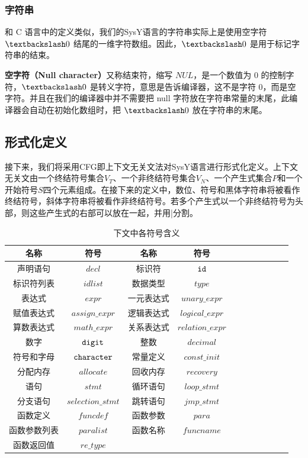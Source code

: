 \documentclass[UTF8,a4paper,10pt]{ctexart}
\begin{document}
\subsubsection{字符串}
和 C 语言中的定义类似，我们的SysY语言的字符串实际上是使用空字符 $\textbackslash0$ 结尾的一维字符数组。因此，$\textbackslash0$ 是用于标记字符串的结束。

\textbf{空字符（Null character）}又称结束符，缩写 $NUL$，是一个数值为 0 的控制字符，$\textbackslash0$ 是转义字符，意思是告诉编译器，这不是字符 0，而是空字符。并且在我们的编译器中并不需要把 null 字符放在字符串常量的末尾，此编译器会自动在初始化数组时，把 $\textbackslash0$ 放在字符串的末尾。













\subsection{形式化定义}
接下来，我们将采用CFG即上下文无关文法对SysY语言进行形式化定义。上下文无关文由一个终结符号集合$V_T$、一个非终结符号集合$V_N$、一个产生式集合$P$和一个开始符号$S$四个元素组成。在接下来的定义中，数位、符号和黑体字符串将被看作终结符号，斜体字符串将被看作非终结符号。若多个产生式以一个非终结符号为头部，则这些产生式的右部可以放在一起，并用|分割。
\begin{table}[!htbp]
  \centering
  \begin{tabular}{ccccccccccc}
  \toprule  
  名称& 符号& 名称& 符号&\\
  \midrule
  声明语句& $decl$& 标识符& $\tt{id}$\\
  标识符列表& $idlist$&数据类型& $type$\\
  表达式&$expr$&一元表达式&$unary\_expr$\\
  赋值表达式&$assign\_expr$&逻辑表达式&$logical\_expr$\\
  算数表达式&$math\_expr$&关系表达式&$relation\_expr$\\
  数字&$\tt{digit}$&整数&$decimal$\\
  符号和字母&$\tt{character}$&常量定义&$const\_init$\\
  分配内存& $allocate$& 回收内存& $recovery$\\
  语句& $stmt$& 循环语句& $loop\_stmt$\\
  分支语句& $selection\_stmt$& 跳转语句& $jmp\_stmt$\\
  函数定义& $funcdef$& 函数参数& $para$\\
  函数参数列表& $paralist$& 函数名称& $funcname$\\
  函数返回值& $re\_type$\\
  \bottomrule
  \end{tabular}
  \caption{下文中各符号含义}
\end{table}
\end{document}
